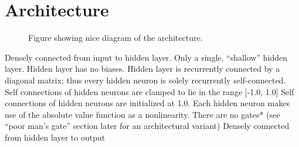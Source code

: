 \documentclass{article}
\begin{document}
%
%
%

\section{Architecture}
\label{headings}
\begin{figure}
  \centering
  
  
  \caption{Figure showing nice diagram of the architecture.}
\end{figure}

Densely connected from input to hidden layer.
Only a single, “shallow” hidden layer.
Hidden layer has no biases.
Hidden layer is recurrently connected by a diagonal matrix; thus every hidden neuron is solely recurrently self-connected.
Self connections of hidden neurons are clamped to lie in the range [-1.0, 1.0]
Self connections of hidden neurons are initialized at 1.0.
Each hidden neuron makes use of the absolute value function as a nonlinearity.
There are no gates* (see “poor man’s gate” section later for an architectural variant)
Densely connected from hidden layer to output

\end{document}
